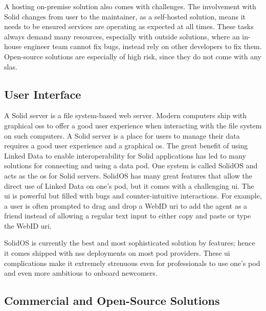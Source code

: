 A hosting on-premise solution also comes with challenges. The involvement with Solid changes from user to the maintainer, as a self-hosted solution, means it needs to be ensured services are operating as expected at all times. These tasks always demand many resources, especially with outside solutions, where an in-house engineer team cannot fix bugs, instead rely on other developers to fix them. Open-source solutions are especially of high risk, since they do not come with any \glspl{sla}.

\subsection{User Interface}

A Solid server is a file system-based web server. Modern computers ship with graphical \glspl{os} to offer a good user experience when interacting with the file system on such computers. A Solid server is a place for users to manage their data requires a good user experience and a graphical \gls{os}. The great benefit of using Linked Data to enable interoperability for Solid applications has led to many solutions for connecting and using a data pod. One system is called SolidOS \cite{solidos} and acts as the \gls{os} for Solid servers. SolidOS has many great features that allow the direct use of Linked Data on one's pod, but it comes with a challenging \gls{ui}. The \gls{ui} is powerful but filled with bugs and counter-intuitive interactions. For example, a user is often prompted to drag and drop a WebID \gls{uri} to add the agent as a friend instead of allowing a regular text input to either copy and paste or type the WebID \gls{uri}.

SolidOS is currently the best and most sophisticated solution by features; hence it comes shipped with \gls{nss} deployments on most pod providers. These \gls{ui} complications make it extremely strenuous even for professionals to use one's pod and even more ambitious to onboard newcomers.

\subsection{Commercial and Open-Source Solutions}

